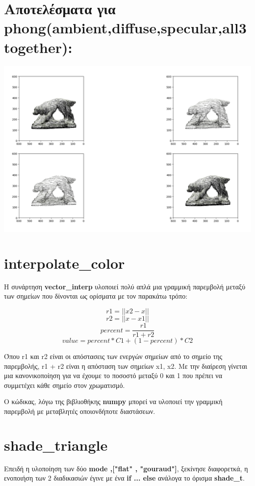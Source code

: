 \documentclass[10pt,a4paper]{article}
\begin{document}
\section*{Αποτελέσματα για \textlatin{phong(ambient,diffuse,specular,all3together)}:} 
\includegraphics[scale=0.35]{phong.png}

\section*{\textlatin{interpolate\_color}}
Η συνάρτηση \textbf{\textlatin{vector\_interp}} υλοποιεί πολύ απλά μια γραμμική παρεμβολή μεταξύ των σημείων που δίνονται ως ορίσματα με τον παρακάτω τρόπο:

\[r1 = ||x2-x||\]   
\[r2 = ||x-x1||\]
\[percent = \frac{r1}{r1 +r2}\]
\[value = percent*C1+(1-percent)*C2\]

Όπου \textlatin{r1} και \textlatin{r2} είναι οι απόστασεις των ενεργών σημείων από το σημείο της παρεμβολής, \textlatin{r1 + r2} είναι η απόσταση των σημείων \textlatin{x1}, \textlatin{x2}. Με την διαίρεση γίνεται μια κανονικοποίηση για να έχουμε το ποσοστό μεταξύ 0 και 1 που πρέπει να συμμετέχει κάθε σημείο στον χρωματισμό. 

Ο κώδικας, λόγω της βιβλιοθήκης \textbf{\textlatin{numpy}} μπορεί να υλοποιεί την γραμμική παρεμβολή με μεταβλητές οποιονδήποτε διαστάσεων.


\section*{\textlatin{shade\_triangle}}
Επειδή η υλοποίηση των δύο \textbf{\textlatin{mode ,["flat" , "gouraud"]}}, ξεκίνησε διαφορετκά, η ενοποιήση των 2 διαδικασιών έγινε με ένα \textbf{\textlatin{if ... else}} ανάλογα το όρισμα \textbf{\textlatin{shade\_t}}.
\end{document}
